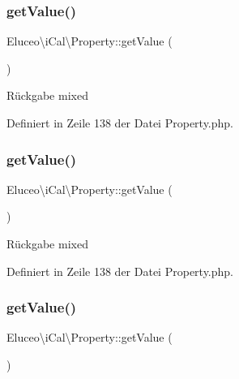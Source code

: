 \subsubsection{\texorpdfstring{get\+Value()}{getValue()}\hspace{0.1cm}{\footnotesize\ttfamily [1/3]}}
{\footnotesize\ttfamily Eluceo\textbackslash{}i\+Cal\textbackslash{}\+Property\+::get\+Value (\begin{DoxyParamCaption}{ }\end{DoxyParamCaption})}

\begin{DoxyReturn}{Rückgabe}
mixed 
\end{DoxyReturn}


Definiert in Zeile 138 der Datei Property.\+php.

\mbox{\label{class_eluceo_1_1i_cal_1_1_property_a2e565cd9324a1f802c741224c9c78864}} 
\subsubsection{\texorpdfstring{get\+Value()}{getValue()}\hspace{0.1cm}{\footnotesize\ttfamily [2/3]}}
{\footnotesize\ttfamily Eluceo\textbackslash{}i\+Cal\textbackslash{}\+Property\+::get\+Value (\begin{DoxyParamCaption}{ }\end{DoxyParamCaption})}

\begin{DoxyReturn}{Rückgabe}
mixed 
\end{DoxyReturn}


Definiert in Zeile 138 der Datei Property.\+php.

\mbox{\label{class_eluceo_1_1i_cal_1_1_property_a2e565cd9324a1f802c741224c9c78864}} 
\subsubsection{\texorpdfstring{get\+Value()}{getValue()}\hspace{0.1cm}{\footnotesize\ttfamily [3/3]}}
{\footnotesize\ttfamily Eluceo\textbackslash{}i\+Cal\textbackslash{}\+Property\+::get\+Value (\begin{DoxyParamCaption}{ }\end{DoxyParamCaption})}

